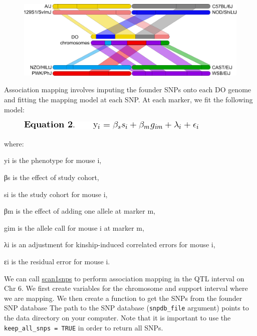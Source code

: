 \documentclass[]{article}
\begin{document}
\begin{figure}
\centering
\includegraphics{../figs/DO.impute.founders.sm.png}
\caption{}
\end{figure}

Association mapping involves imputing the founder SNPs onto each DO
genome and fitting the mapping model at each SNP. At each marker, we fit
the following model:

\begin{figure}
\centering
\includegraphics{../figs/equation2.png}
\caption{}
\end{figure}

where:

yi is the phenotype for mouse i,

βs is the effect of study cohort,

si is the study cohort for mouse i,

βm is the effect of adding one allele at marker m,

gim is the allele call for mouse i at marker m,

λi is an adjustment for kinship-induced correlated errors for mouse i,

εi is the residual error for mouse i.

We can call
\href{https://github.com/rqtl/qtl2/blob/master/R/scan1snps.R}{scan1snps}
to perform association mapping in the QTL interval on Chr 6. We first
create variables for the chromosome and support interval where we are
mapping. We then create a function to get the SNPs from the founder SNP
database The path to the SNP database (\texttt{snpdb\_file} argument)
points to the data directory on your computer. Note that it is important
to use the \texttt{keep\_all\_snps\ =\ TRUE} in order to return all
SNPs.
\end{document}
